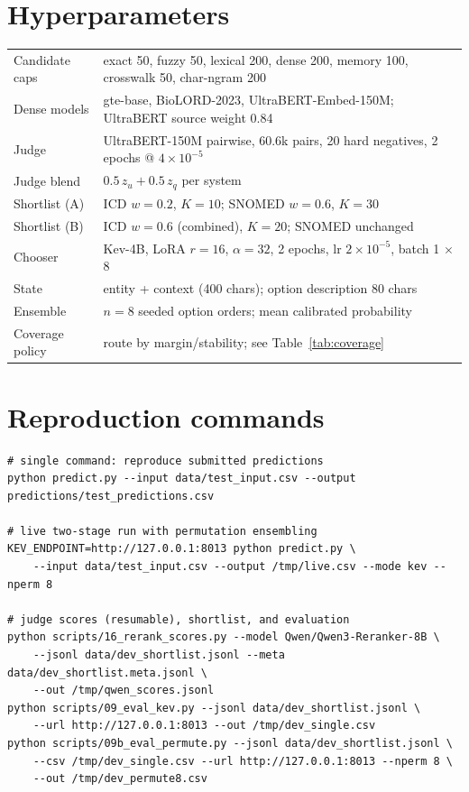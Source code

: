 \documentclass[11pt]{article}
\begin{document}
\appendix
\section{Hyperparameters}
\begin{table}[H]
\centering
\small
\begin{tabular}{@{}ll@{}}
\toprule
Candidate caps & exact 50, fuzzy 50, lexical 200, dense 200, memory 100, crosswalk 50, char-ngram 200\\
Dense models & gte-base, BioLORD-2023, UltraBERT-Embed-150M; UltraBERT source weight 0.84\\
Judge & UltraBERT-150M pairwise, 60.6k pairs, 20 hard negatives, 2 epochs @ $4\times10^{-5}$\\
Judge blend & $0.5\,z_u+0.5\,z_q$ per system\\
Shortlist (A) & ICD $w{=}0.2$, $K{=}10$; SNOMED $w{=}0.6$, $K{=}30$\\
Shortlist (B) & ICD $w{=}0.6$ (combined), $K{=}20$; SNOMED unchanged\\
Chooser & Kev-4B, LoRA $r{=}16$, $\alpha{=}32$, 2 epochs, lr $2\times10^{-5}$, batch 1 $\times$ 8\\
State & entity + context (400 chars); option description 80 chars\\
Ensemble & $n{=}8$ seeded option orders; mean calibrated probability\\
Coverage policy & route by margin/stability; see Table~\ref{tab:coverage}\\
\bottomrule
\end{tabular}
\end{table}

\section{Reproduction commands}
\begin{lstlisting}
# single command: reproduce submitted predictions
python predict.py --input data/test_input.csv --output predictions/test_predictions.csv

# live two-stage run with permutation ensembling
KEV_ENDPOINT=http://127.0.0.1:8013 python predict.py \
    --input data/test_input.csv --output /tmp/live.csv --mode kev --nperm 8

# judge scores (resumable), shortlist, and evaluation
python scripts/16_rerank_scores.py --model Qwen/Qwen3-Reranker-8B \
    --jsonl data/dev_shortlist.jsonl --meta data/dev_shortlist.meta.jsonl \
    --out /tmp/qwen_scores.jsonl
python scripts/09_eval_kev.py --jsonl data/dev_shortlist.jsonl \
    --url http://127.0.0.1:8013 --out /tmp/dev_single.csv
python scripts/09b_eval_permute.py --jsonl data/dev_shortlist.jsonl \
    --csv /tmp/dev_single.csv --url http://127.0.0.1:8013 --nperm 8 \
    --out /tmp/dev_permute8.csv
\end{lstlisting}
\end{document}
